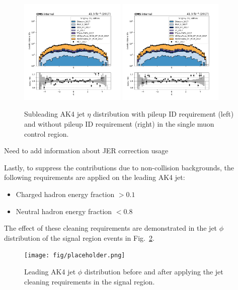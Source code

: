 \begin{figure}[htbp]
  \centering
        \includegraphics[width=0.45\textwidth]{fig/datamc/cr_1m_vbf/cr_1m_vbf_ak4_eta1_losf_2017_withpuid.png}
        \includegraphics[width=0.45\textwidth]{fig/datamc/cr_1m_vbf/cr_1m_vbf_ak4_eta1_losf_2017_withoutpuid.png}
  \caption{Subleading AK4 jet $\eta$ distribution with pileup ID requirement (left) and without pileup ID requirement (right) in the single muon control region.}
  \label{fig:pileupid}
\end{figure}

{\color{red} Need to add information about JER correction usage}

Lastly, to suppress the contributions due to non-collision backgrounds, the following
requirements are applied on the leading AK4 jet:
\begin{itemize}
\item Charged hadron energy fraction $> 0.1$
\item Neutral hadron energy fraction $< 0.8$
\end{itemize}

The effect of these cleaning requirements are demonstrated in the jet $\phi$ distribution of
the signal region events in Fig.~\ref{fig:jetcleaning}.

\begin{figure}[htbp]
  \centering
        \texttt{[image: fig/placeholder.png]}
  \caption{Leading AK4 jet $\phi$ distribution before and after applying the jet cleaning
requirements in the signal region.}
  \label{fig:jetcleaning}
\end{figure}

